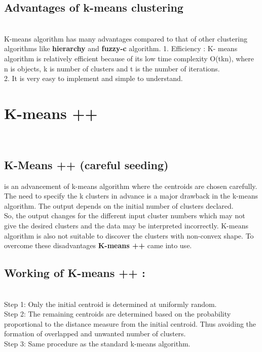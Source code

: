\documentclass[11pt]{article}
\begin{document}
\subsection{Advantages of k-means clustering}\\

K-means algorithm has many advantages compared to that of other clustering algorithms like \textbf{hierarchy} and \textbf{fuzzy-c} algorithm.
	1. Efficiency : K- means algorithm is relatively efficient because of its low time complexity O(tkn), where n is objects, k is number of clusters and t is the number of iterations.\\
	2. It is very easy to implement and simple to understand.\\
	
\section{K-means ++}\\

\subsection{K-Means ++ (careful seeding)} is an advancement of k-means algorithm where the centroids are chosen carefully. The need to specify the k clusters in advance is a major drawback in the k-means algorithm. The output depends on the initial number of clusters declared.\\
	So, the output changes for the different input cluster numbers which may not give the desired clusters and the data may be interpreted incorrectly.
K-means algorithm is also not suitable to discover the clusters with non-convex shape. To overcome these disadvantages \textbf{K-means ++} came into use.\\

\subsection{Working of K-means ++ :}
 \\
Step 1: Only the initial centroid is determined at uniformly random.\\
Step 2: The remaining centroids are determined based on the probability proportional to the distance measure from the initial centroid. Thus avoiding the formation of overlapped and unwanted number of clusters.\\
Step 3: Same procedure as the standard k-means algorithm.\\


\end{document}
